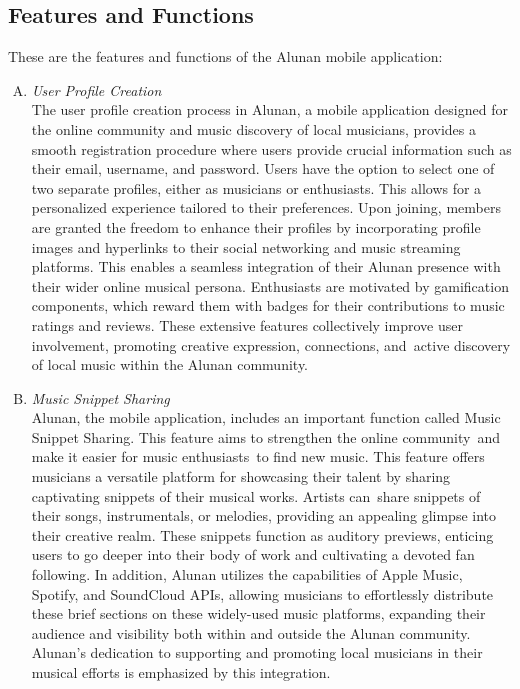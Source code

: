 \subsection{Features and Functions}
These are the features and functions of the Alunan mobile application:
\begin{enumerate}[A.]
    \item \textit{User Profile Creation}\\
    The user profile creation process in Alunan, a mobile application designed for the online community and music discovery of local musicians, provides a smooth registration procedure where users provide crucial information such as their email, username, and password. Users have the option to select one of two separate profiles, either as musicians or enthusiasts. This allows for a personalized experience tailored to their preferences. Upon joining, members are granted the freedom to enhance their profiles by incorporating profile images and hyperlinks to their social networking and music streaming platforms. This enables a seamless integration of their Alunan presence with their wider online musical persona. Enthusiasts are motivated by gamification components, which reward them with badges for their contributions to music ratings and reviews. These extensive features collectively improve user involvement, promoting creative expression, connections, and active discovery of local music within the Alunan community.
    \item \textit{Music Snippet Sharing}\\
    Alunan, the mobile application, includes an important function called Music Snippet Sharing. This feature aims to strengthen the online community and make it easier for music enthusiasts to find new music. This feature offers musicians a versatile platform for showcasing their talent by sharing captivating snippets of their musical works. Artists can share snippets of their songs, instrumentals, or melodies, providing an appealing glimpse into their creative realm. These snippets function as auditory previews, enticing users to go deeper into their body of work and cultivating a devoted fan following. In addition, Alunan utilizes the capabilities of Apple Music, Spotify, and SoundCloud APIs, allowing musicians to effortlessly distribute these brief sections on these widely-used music platforms, expanding their audience and visibility both within and outside the Alunan community. Alunan's dedication to supporting and promoting local musicians in their musical efforts is emphasized by this integration.

\end{enumerate}
